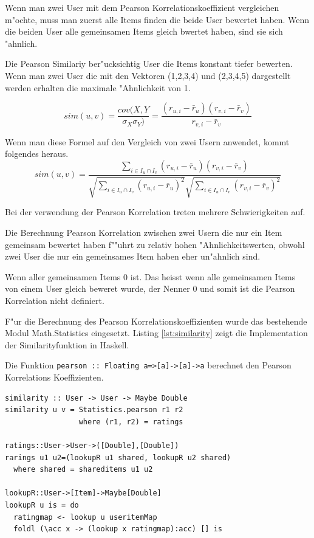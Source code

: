 \documentclass[a4paper, 11pt]{article}
\begin{document}
Wenn man zwei User mit dem Pearson Korrelationskoeffizient vergleichen m"ochte, muss man zuerst alle Items finden die beide User bewertet haben. Wenn die beiden User alle gemeinsamen Items gleich bwertet haben, sind sie sich "ahnlich.

Die Pearson Similariy ber"ucksichtig User die Items konstant tiefer bewerten. Wenn man zwei User die mit den Vektoren (1,2,3,4) und (2,3,4,5) dargestellt werden erhalten die maximale "Ahnlichkeit von 1.

\begin{equation}
 sim(u,v) = \frac{cov(X,Y}{\sigma_X \sigma_Y)} = \frac{(r_{u,i} - \bar{r}_u)(r_{v,i} - \bar{r}_v)}{r_{v,i} - \bar{r}_v}    
\end{equation}

Wenn man diese Formel auf den Vergleich von zwei Usern anwendet, kommt folgendes heraus.
\begin{equation}
 sim(u,v) = \frac{\sum_{i \in I_u \cap I_v} (r_{u,i} - \bar{r}_u)(r_{v,i} - \bar{r}_v)}{\sqrt{\sum_{i \in I_u \cap I_v}(r_{u,i} - \bar{r}_u)^2}\sqrt{\sum_{i \in I_u \cap I_v}(r_{v,i} - \bar{r}_v)^2}}
\end{equation}

Bei der verwendung der Pearson Korrelation treten mehrere Schwierigkeiten auf.

Die Berechnung Pearson Korrelation zwischen zwei Usern die nur ein Item gemeinsam bewertet haben f""uhrt zu relativ hohen "Ahnlichkeitswerten, obwohl zwei User die nur ein gemeinsames Item haben eher un"ahnlich sind.

Wenn aller gemeinsamen Items 0 ist. Das heisst wenn alle gemeinsamen Items von einem User gleich beweret wurde, der Nenner 0 und somit ist die Pearson Korrelation nicht definiert.

F"ur die Berechnung des Pearson Korrelationskoeffizienten wurde das bestehende Modul Math.Statistics eingesetzt. Listing \ref{lst:similarity} zeigt die Implementation der Similarityfunktion in Haskell.

Die Funktion \verb|pearson :: Floating a=>[a]->[a]->a| berechnet den Pearson Korrelations Koeffizienten.

\begin{lstlisting}[caption=Similarity, label=lst:similarity]
similarity :: User -> User -> Maybe Double
similarity u v = Statistics.pearson r1 r2
                 where (r1, r2) = ratings

ratings::User->User->([Double],[Double])
rarings u1 u2=(lookupR u1 shared, lookupR u2 shared)
  where shared = shareditems u1 u2

lookupR::User->[Item]->Maybe[Double]
lookupR u is = do
  ratingmap <- lookup u useritemMap
  foldl (\acc x -> (lookup x ratingmap):acc) [] is
\end{lstlisting}
\end{document}
